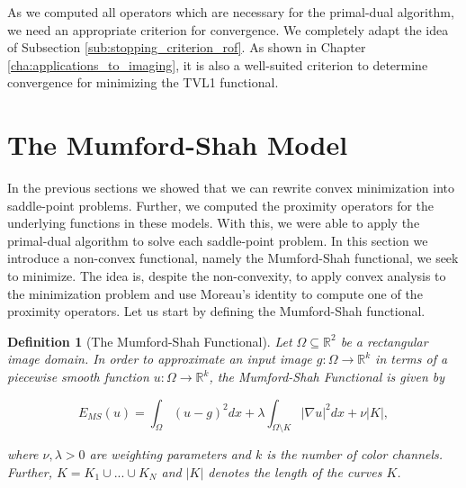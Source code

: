 \documentclass[abstracton]{scrreprt}
\newtheorem{definition}[theorem]{Definition}
\begin{document}
            As we computed all operators which are necessary for the primal-dual algorithm, we need an appropriate criterion for convergence. We completely adapt the idea of Subsection \ref{sub:stopping_criterion_rof}. As shown in Chapter \ref{cha:applications_to_imaging}, it is also a well-suited criterion to determine convergence for minimizing the TVL1 functional.

    \section{The Mumford-Shah Model} %
    \label{sec:the_mumford_shah_model}
        
        In the previous sections we showed that we can rewrite convex minimization into saddle-point problems. Further, we computed the proximity operators for the underlying functions in these models. With this, we were able to apply the primal-dual algorithm to solve each saddle-point problem. In this section we introduce a non-convex functional, namely the Mumford-Shah functional, we seek to minimize. The idea is, despite the non-convexity, to apply convex analysis to the minimization problem and use Moreau's identity to compute one of the proximity operators. Let us start by defining the Mumford-Shah functional.
        \begin{definition}[The Mumford-Shah Functional] %
        \label{def:the_mumford_shah_functional}
            Let $\Omega \subseteq \mathbb{R}^{2}$ be a rectangular image domain. In order to approximate an input image $g: \Omega \longrightarrow \mathbb{R}^{k}$ in terms of a piecewise smooth function $u: \Omega \longrightarrow \mathbb{R}^{k}$, the Mumford-Shah Functional is given by
                    
                    \begin{equation}
                        E_{MS}(u) = \int_{\Omega} (u - g)^{2} dx + \lambda \int_{\Omega \setminus K} |\nabla u|^{2} dx + \nu |K|,
                    \end{equation}
                    \label{eq:the_mumford_shah_functional}
                
                where $\nu, \lambda > 0$ are weighting parameters and $k$ is the number of color channels. Further, $K = K_{1} \cup ... \cup K_{N}$ and $|K|$ denotes the length of the curves $K$.
        \end{definition}
\end{document}
